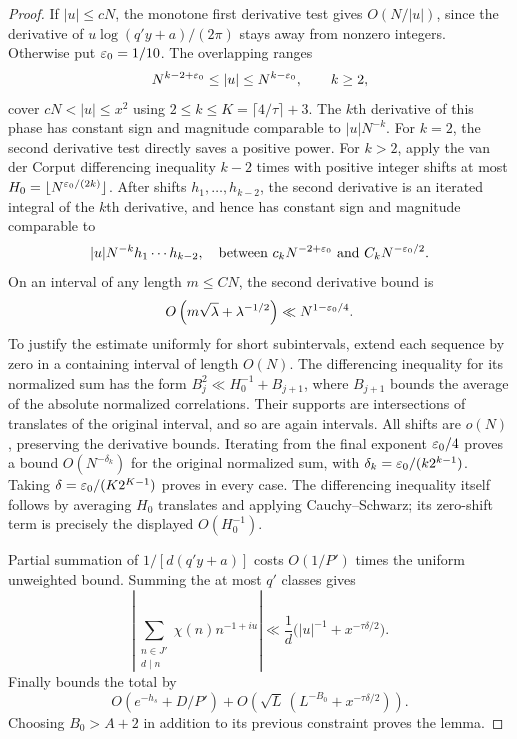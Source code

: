 \begin{proof}
If $|u|\leq cN$, the monotone first derivative test gives
$O(N/|u|)$, since the derivative of $u\log(q'y+a)/(2\pi)$
stays away from nonzero integers. Otherwise put $\varepsilon_0=1/10$.
The overlapping ranges
\[
       N^{k-2+\varepsilon_0}\leq|u|\leq N^{k-\varepsilon_0},\qquad k\geq2,
\]
cover $cN<|u|\leq x^2$ using
$2\leq k\leq K=\lceil4/\tau\rceil+3$. The $k$th derivative of
this phase has constant sign and magnitude comparable to
$|u|N^{-k}$. For $k=2$, the second derivative test directly saves
a positive power. For $k>2$, apply the van der Corput differencing
inequality $k-2$ times with positive integer shifts at most
$H_0=\lfloor N^{\varepsilon_0/(2k)}\rfloor$.
After shifts $h_1,\ldots,h_{k-2}$, the second derivative is an
iterated integral of the $k$th derivative, and hence has constant
sign and magnitude comparable to
\[
 |u|N^{-k}h_1\cdots h_{k-2},
 \quad\text{between }c_kN^{-2+\varepsilon_0}
                      \text{ and }C_kN^{-\varepsilon_0/2}.
\]
On an interval of any length $m\leq C N$, the second derivative
bound is
\[
 O\left(m\sqrt\lambda+\lambda^{-1/2}\right)
                         \ll N^{1-\varepsilon_0/4}.
\]
To justify the estimate uniformly for short subintervals, extend
each sequence by zero in a containing interval of length $O(N)$.
The differencing inequality for its normalized sum has the form
$B_j^2\ll H_0^{-1}+B_{j+1}$, where $B_{j+1}$ bounds the average
of the absolute normalized correlations. Their supports are
intersections of translates of the original interval, and so are
again intervals. All shifts are $o(N)$, preserving the derivative
bounds. Iterating from the final exponent $\varepsilon_0/4$ proves a
bound $O(N^{-\delta_k})$ for the original normalized sum, with
$\delta_k=\varepsilon_0/(k2^{k-1})$. Taking
$\delta=\varepsilon_0/(K2^{K-1})$ proves  in every
case. The differencing inequality itself follows by averaging
$H_0$ translates and applying Cauchy--Schwarz; its zero-shift term
is precisely the displayed $O(H_0^{-1})$.

Partial summation of $1/[d(q'y+a)]$ costs $O(1/P')$ times the
uniform unweighted bound. Summing the at most $q'$ classes gives
\[
 \left|\sum_{\substack{n\in J'\\d\mid n}}
                      \chi(n)n^{-1+iu}\right|
   \ll\frac1d\bigl(|u|^{-1}+x^{-\tau\delta/2}\bigr).
\]
Finally  bounds the total by
\[
 O(e^{-h_s}+D/P')+
 O\left(\sqrt L\,(L^{-B_0}+x^{-\tau\delta/2})\right).
\]
Choosing $B_0>A+2$ in addition to its previous constraint proves
the lemma.
\end{proof}

